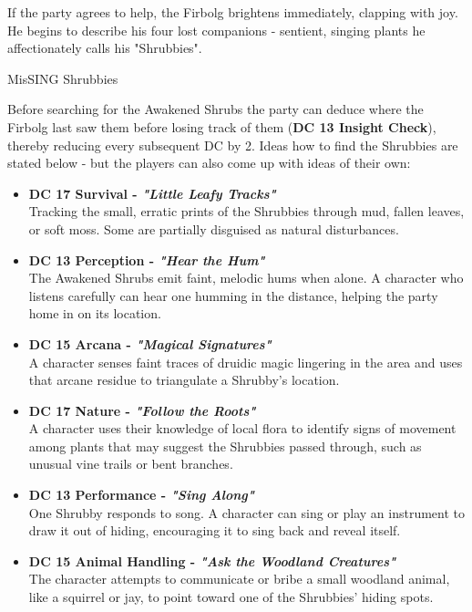 {\noindent\entryfont If the party agrees to help, the Firbolg brightens immediately, clapping with joy. He begins to describe his four lost companions - sentient, singing plants he affectionately calls his "Shrubbies".}

\begin{DndQuestHook}[width=0.5\textwidth - 4pt]{{\large Mis}SING Shrubbies}
	\DndQuestHookBasics[
		location = {Way of Tay, South of Dundee},
		quest-giver = {Firbolg},
		objective = {Find the 4 Awakened Shrubs in the woods.},
	]
	
	{%
		\noindent\entryfont Before searching for the Awakened Shrubs the party can deduce where the Firbolg last saw them before losing track of them (\textbf{DC 13 Insight Check}), thereby reducing every subsequent DC by 2. Ideas how to find the Shrubbies are stated below - but the players can also come up with ideas of their own:
		\begin{itemize}
			\renewcommand\labelitemi{\textbf{\textbullet}}
			\item \textbf{DC 17 Survival - \textit{"Little Leafy Tracks"}}\\Tracking the small, erratic prints of the Shrubbies through mud, fallen leaves, or soft moss. Some are partially disguised as natural disturbances.
			\item \textbf{DC 13 Perception - \textit{"Hear the Hum"}}\\The Awakened Shrubs emit faint, melodic hums when alone. A character who listens carefully can hear one humming in the distance, helping the party home in on its location.
			\item \textbf{DC 15 Arcana - \textit{"Magical Signatures"}}\\A character senses faint traces of druidic magic lingering in the area and uses that arcane residue to triangulate a Shrubby's location.
			\item \textbf{DC 17 Nature - \textit{"Follow the Roots"}}\\A character uses their knowledge of local flora to identify signs of movement among plants that may suggest the Shrubbies passed through, such as unusual vine trails or bent branches.
			\item \textbf{DC 13 Performance - \textit{"Sing Along"}}\\One Shrubby responds to song. A character can sing or play an instrument to draw it out of hiding, encouraging it to sing back and reveal itself.
			\item \textbf{DC 15 Animal Handling - \textit{"Ask the Woodland Creatures"}}\\The character attempts to communicate or bribe a small woodland animal, like a squirrel or jay, to point toward one of the Shrubbies' hiding spots.
		\end{itemize}
	}%
	

\end{DndQuestHook}
